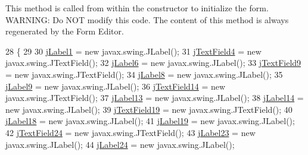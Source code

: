This method is called from within the constructor to initialize the form. W\+A\+R\+N\+I\+NG\+: Do N\+OT modify this code. The content of this method is always regenerated by the Form Editor. 
\begin{DoxyCode}
28                                   \{
29 
30         \mbox{\hyperlink{classinterfacessoguar_1_1paenrique_a69df573814db382c28d77ef7064da795}{jLabel1}} = \textcolor{keyword}{new} javax.swing.JLabel();
31         \mbox{\hyperlink{classinterfacessoguar_1_1paenrique_a2302a6403a015e775096556c687e4fe1}{jTextField4}} = \textcolor{keyword}{new} javax.swing.JTextField();
32         \mbox{\hyperlink{classinterfacessoguar_1_1paenrique_aefb6dc4d3f0f469be0d03f9f4c7326bb}{jLabel6}} = \textcolor{keyword}{new} javax.swing.JLabel();
33         \mbox{\hyperlink{classinterfacessoguar_1_1paenrique_a381c34741919609d05e0045d816b5725}{jTextField9}} = \textcolor{keyword}{new} javax.swing.JTextField();
34         \mbox{\hyperlink{classinterfacessoguar_1_1paenrique_ac20f17274561ba46a613d1f05c5bb218}{jLabel8}} = \textcolor{keyword}{new} javax.swing.JLabel();
35         \mbox{\hyperlink{classinterfacessoguar_1_1paenrique_aeb67da672ddf8c985dec99dc697b750c}{jLabel9}} = \textcolor{keyword}{new} javax.swing.JLabel();
36         \mbox{\hyperlink{classinterfacessoguar_1_1paenrique_aa8f99e5eec16f87bcbd493e159554332}{jTextField14}} = \textcolor{keyword}{new} javax.swing.JTextField();
37         \mbox{\hyperlink{classinterfacessoguar_1_1paenrique_a4b950a5b2a126d8b9d9bcb1578605f13}{jLabel13}} = \textcolor{keyword}{new} javax.swing.JLabel();
38         \mbox{\hyperlink{classinterfacessoguar_1_1paenrique_a3155f4aea6f0a87b75cb71152763fe4a}{jLabel14}} = \textcolor{keyword}{new} javax.swing.JLabel();
39         \mbox{\hyperlink{classinterfacessoguar_1_1paenrique_af87913542063bf9f8df4c2adeb0da744}{jTextField19}} = \textcolor{keyword}{new} javax.swing.JTextField();
40         \mbox{\hyperlink{classinterfacessoguar_1_1paenrique_a81a2ccdeb485bf8ec4bdc5f952b83e21}{jLabel18}} = \textcolor{keyword}{new} javax.swing.JLabel();
41         \mbox{\hyperlink{classinterfacessoguar_1_1paenrique_ab4f7d75f1e894ee3d7f89612ca7f300c}{jLabel19}} = \textcolor{keyword}{new} javax.swing.JLabel();
42         \mbox{\hyperlink{classinterfacessoguar_1_1paenrique_a7c88cab75dfa57f0ba92d8c84f8851d2}{jTextField24}} = \textcolor{keyword}{new} javax.swing.JTextField();
43         \mbox{\hyperlink{classinterfacessoguar_1_1paenrique_a925293df4e0f65ac4b51ef429935f333}{jLabel23}} = \textcolor{keyword}{new} javax.swing.JLabel();
44         \mbox{\hyperlink{classinterfacessoguar_1_1paenrique_a2ac7ac55fe97038c90f1e66dd1af19d0}{jLabel24}} = \textcolor{keyword}{new} javax.swing.JLabel();

\end{DoxyCode}
